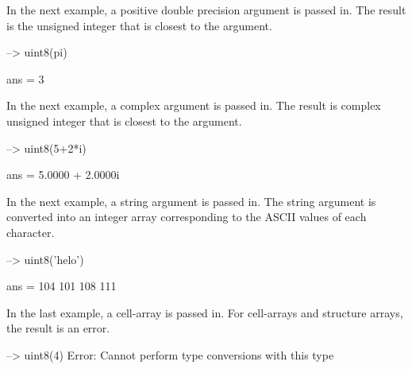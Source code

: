 In the next example, a positive double precision argument is passed in. The result is the unsigned integer that is closest to the argument.


\begin{DoxyVerbInclude}
--> uint8(pi)

ans = 
 3 
\end{DoxyVerbInclude}


In the next example, a complex argument is passed in. The result is complex unsigned integer that is closest to the argument.


\begin{DoxyVerbInclude}
--> uint8(5+2*i)

ans = 
   5.0000 +  2.0000i 
\end{DoxyVerbInclude}


In the next example, a string argument is passed in. The string argument is converted into an integer array corresponding to the A\-S\-C\-I\-I values of each character.


\begin{DoxyVerbInclude}
--> uint8('helo')

ans = 
 104 101 108 111 
\end{DoxyVerbInclude}


In the last example, a cell-\/array is passed in. For cell-\/arrays and structure arrays, the result is an error.


\begin{DoxyVerbInclude}
--> uint8({4})
Error: Cannot perform type conversions with this type
\end{DoxyVerbInclude}
 